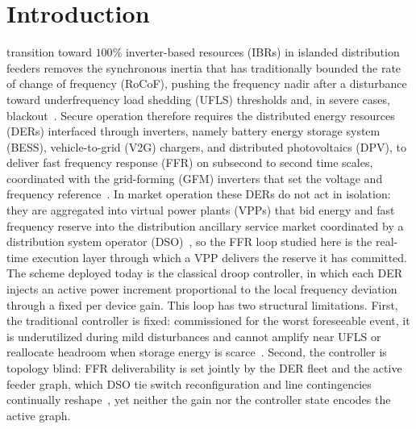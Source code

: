 \documentclass[lettersize,journal]{IEEEtran}
\begin{document}
	\section{Introduction}
	\label{sec:intro}
	
	 transition toward $100$\% inverter-based resources (IBRs) in islanded distribution feeders removes the synchronous inertia that has traditionally bounded the rate of change of frequency (RoCoF), pushing the frequency nadir after a disturbance toward underfrequency load shedding (UFLS) thresholds and, in severe cases, blackout~\cite{roy2022overview}. Secure operation therefore requires the distributed energy resources (DERs) interfaced through inverters, namely battery energy storage system (BESS), vehicle-to-grid (V2G) chargers, and distributed photovoltaics (DPV), to deliver fast frequency response (FFR) on subsecond to second time scales, coordinated with the grid-forming (GFM) inverters that set the voltage and frequency reference~\cite{salem2025gfmreview}. In market operation these DERs do not act in isolation: they are aggregated into virtual power plants (VPPs) that bid energy and fast frequency reserve into the distribution ancillary service market coordinated by a distribution system operator (DSO)~\cite{liu2025fastresponse}, so the FFR loop studied here is the real-time execution layer through which a VPP delivers the reserve it has committed. The scheme deployed today is the classical droop controller, in which each DER injects an active power increment proportional to the local frequency deviation through a fixed per device gain. This loop has two structural limitations. First, the traditional controller is fixed: commissioned for the worst foreseeable event, it is underutilized during mild disturbances and cannot amplify near UFLS or reallocate headroom when storage energy is scarce~\cite{boutfarjoute2025fuzzy}. Second, the controller is topology blind: FFR deliverability is set jointly by the DER fleet and the active feeder graph, which DSO tie switch reconfiguration and line contingencies continually reshape~\cite{jacob2024outage}, yet neither the gain nor the controller state encodes the active graph.
	
\end{document}
